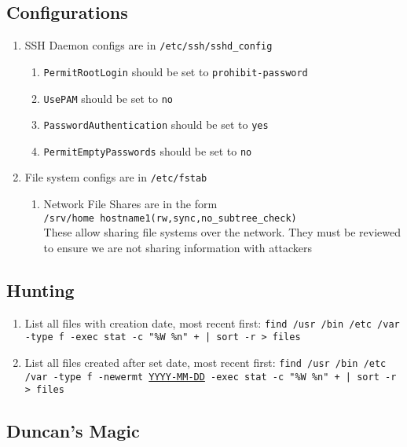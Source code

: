 \documentclass[12pt,letterpaper]{article}
\def\code#1{\textcolor{iris}{\texttt{#1}}}
\def\ul#1{\underline{#1}}
\begin{document}
\subsection{Configurations}

\begin{enumerate}
	\item SSH Daemon configs are in \code{/etc/ssh/sshd\_config}
		\begin{enumerate}
			\item \code{PermitRootLogin} should be set to \code{prohibit-password}
			\item \code{UsePAM} should be set to \code{no}
			\item \code{PasswordAuthentication} should be set to \code{yes}
			\item \code{PermitEmptyPasswords} should be set to \code{no}
		\end{enumerate}
	\item File system configs are in \code{/etc/fstab}
		\begin{enumerate}
			\item Network File Shares are in the form \\
				\code{/srv/home    hostname1(rw,sync,no\_subtree\_check)} \\
				These allow sharing file systems over the network.  They must be reviewed to ensure we are not sharing information with attackers
		\end{enumerate}
\end{enumerate}

\subsection{Hunting}

\begin{enumerate}
	\item List all files with creation date, most recent first: \code{find /usr /bin /etc /var -type f -exec stat -c "\%W \%n" {} + | sort -r > files}
	\item List all files created after set date, most recent first: \code{find /usr /bin /etc /var -type f -newermt \ul{YYYY-MM-DD} -exec stat -c "\%W \%n" {} + | sort -r > files}
\end{enumerate}

\subsection{Duncan's Magic}
\end{document}
